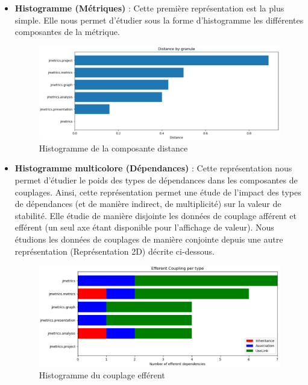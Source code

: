 \documentclass{scrartcl}
\begin{document}
    \begin{itemize}
        \item \textbf{Histogramme (Métriques)} : Cette première représentation est la plus simple. Elle nous permet d'étudier sous la forme d'histogramme les différentes composantes de la métrique.
        \begin{figure}[h!]
            \centering
            \includegraphics[width=\textwidth]{img/plot/metrics_histogram_distance.png}
            \caption{Histogramme de la composante distance}
        \end{figure}
        
        \item \textbf{Histogramme multicolore (Dépendances)} : Cette représentation nous permet d'étudier le poids des types de dépendances dans les composantes de couplages. Ainsi, cette représentation permet une étude de l'impact des types de dépendances (et de manière indirect, de multiplicité) sur la valeur de stabilité. Elle étudie de manière disjointe les données de couplage afférent et efférent (un seul axe étant disponible pour l'affichage de valeur). Nous étudions les données de couplages de manière conjointe depuis une autre représentation (Représentation 2D) décrite ci-dessous.
        \begin{figure}[h!]
            \centering
            \includegraphics[width=\textwidth]{img/plot/dependencies_histogram.png}
            \caption{Histogramme du couplage efférent}
        \end{figure}
        

\end{itemize}
\end{document}
